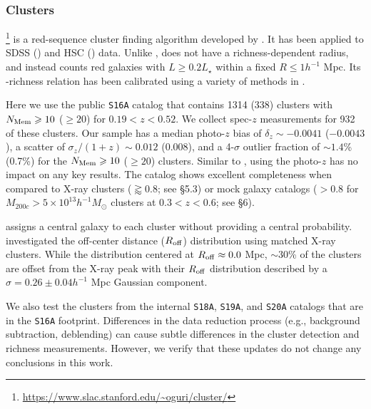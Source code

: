 \documentclass[fleqn,usenatbib,useAMS,english]{mnras}
\begin{document}
\subsubsection{\camira{} Clusters}
    \label{sec:cluster_camira}

    \camira{}\footnote{\url{https://www.slac.stanford.edu/~oguri/cluster/}} is a
    red-sequence cluster finding algorithm developed by \citet{Oguri2014}.
    It has been applied to SDSS (\citealt{Oguri2014}) and HSC (\citealt{Oguri2018}) data.
    Unlike \redm{}, \camira{} does not have a richness-dependent radius, and instead counts
    red galaxies with $L \geq 0.2L_{\star}$ within a fixed $R\leq 1 h^{-1}$ Mpc.
    Its \mvir{}-richness relation has been calibrated using a variety of methods in
    \citet{Murata2019, Chiu2020a, Chiu2020b}.

    Here we use the public \texttt{S16A} \camira{} catalog that contains 1314 (338) clusters
    with $N_{\rm Mem} \geq 10$ ($\geq 20$) for $0.19 < z < 0.52$.
    We collect spec-$z$ measurements for 932 of these clusters.
    Our \camira{} sample has a median photo-$z$ bias of $\delta_{z} \sim -0.0041$ ($-0.0043$), a
    scatter of $\sigma_{z}/(1 + z) \sim 0.012$ (0.008), and a 4-$\sigma$ outlier fraction of
    $\sim 1.4$\% (0.7\%) for the $N_{\rm Mem} \geq 10$ ($\geq 20$) clusters.
    Similar to \redm{}, using the photo-$z$ has no impact on any key results.
    The \camira{} catalog shows excellent completeness when compared to X-ray clusters
    ($\gtrapprox 0.8$; see \citealt{Oguri2018} \S 5.3) or mock galaxy catalogs ($> 0.8$ for
    $M_{200c} > 5 \times 10^{13} h^{-1} M_{\odot}$ clusters at $0.3 < z < 0.6$; see
    \citealt{Oguri2018} \S 6).

    \camira{} assigns a central galaxy to each cluster without providing a central probability.
    \citet{Oguri2018} investigated the off-center distance ($R_{\rm off}$) distribution using
    matched X-ray clusters.
    While the distribution centered at $R_{\rm off} \approx 0.0$ Mpc, $\sim 30$\% of the clusters
    are offset from the X-ray peak with their $R_{\rm off}$ distribution described by a
    $\sigma=0.26 \pm 0.04 h^{-1}$ Mpc Gaussian component.

    We also test the clusters from the internal \texttt{S18A}, \texttt{S19A}, and
    \texttt{S20A} \camira{} catalogs that are in the \texttt{S16A} footprint.
    Differences in the data reduction process (e.g., background subtraction, deblending)
    can cause subtle differences in the cluster detection and richness measurements.
    However, we verify that these updates do not change any conclusions in this work.
\end{document}
